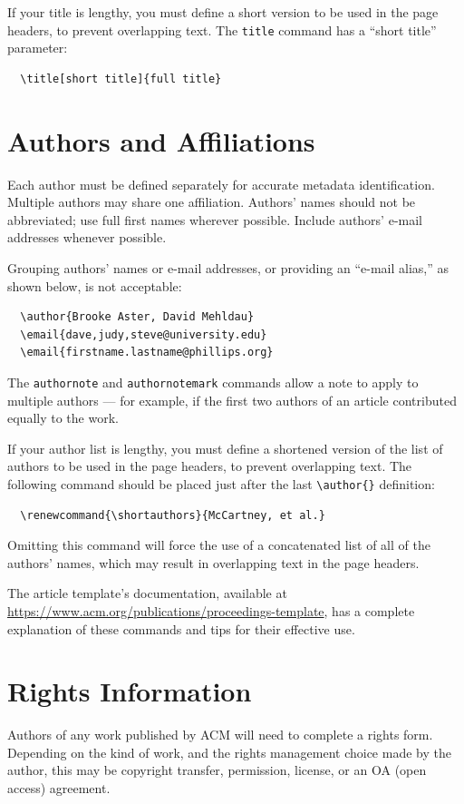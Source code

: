 \documentclass[sigchi]{acmart}
\begin{document}
If your title is lengthy, you must define a short version to be used
in the page headers, to prevent overlapping text. The \verb|title|
command has a ``short title'' parameter:
\begin{verbatim}
  \title[short title]{full title}
\end{verbatim}

\section{Authors and Affiliations}

Each author must be defined separately for accurate metadata
identification. Multiple authors may share one affiliation. Authors'
names should not be abbreviated; use full first names wherever
possible. Include authors' e-mail addresses whenever possible.

Grouping authors' names or e-mail addresses, or providing an ``e-mail
alias,'' as shown below, is not acceptable:
\begin{verbatim}
  \author{Brooke Aster, David Mehldau}
  \email{dave,judy,steve@university.edu}
  \email{firstname.lastname@phillips.org}
\end{verbatim}

The \verb|authornote| and \verb|authornotemark| commands allow a note
to apply to multiple authors --- for example, if the first two authors
of an article contributed equally to the work.

If your author list is lengthy, you must define a shortened version of
the list of authors to be used in the page headers, to prevent
overlapping text. The following command should be placed just after
the last \verb|\author{}| definition:
\begin{verbatim}
  \renewcommand{\shortauthors}{McCartney, et al.}
\end{verbatim}
Omitting this command will force the use of a concatenated list of all
of the authors' names, which may result in overlapping text in the
page headers.

The article template's documentation, available at
\url{https://www.acm.org/publications/proceedings-template}, has a
complete explanation of these commands and tips for their effective
use.

\section{Rights Information}

Authors of any work published by ACM will need to complete a rights
form. Depending on the kind of work, and the rights management choice
made by the author, this may be copyright transfer, permission,
license, or an OA (open access) agreement.
\end{document}
